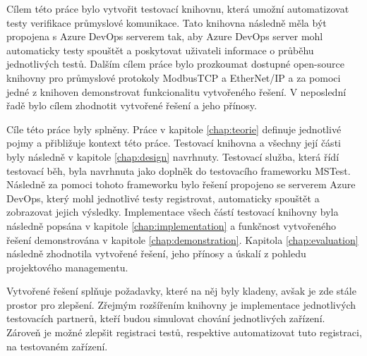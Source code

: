 \begin{conclusion}
Cílem této práce bylo vytvořit testovací knihovnu, která umožní automatizovat testy verifikace průmyslové komunikace. Tato knihovna následně měla být propojena s Azure DevOps serverem tak, aby Azure DevOps server mohl automaticky testy spouštět a poskytovat uživateli informace o průběhu jednotlivých testů. Dalším cílem práce bylo prozkoumat dostupné open-source knihovny pro průmyslové protokoly ModbusTCP a EtherNet/IP a za pomoci jedné z knihoven demonstrovat funkcionalitu vytvořeného řešení. V neposlední řadě bylo cílem zhodnotit vytvořené řešení a jeho přínosy.

Cíle této práce byly splněny. Práce v kapitole \ref{chap:teorie} definuje jednotlivé pojmy a přibližuje kontext této práce. Testovací knihovna a všechny její části byly následně v kapitole \ref{chap:design} navrhnuty. Testovací služba, která řídí testovací běh, byla navrhnuta jako doplněk do testovacího frameworku MSTest. Následně za pomoci tohoto frameworku bylo řešení propojeno se serverem Azure DevOps, který mohl jednotlivé testy registrovat, automaticky spouštět a zobrazovat jejich výsledky. Implementace všech částí testovací knihovny byla následně popsána v kapitole \ref{chap:implementation} a funkčnost vytvořeného řešení demonstrována v kapitole \ref{chap:demonstration}. Kapitola \ref{chap:evaluation} následně zhodnotila vytvořené řešení, jeho přínosy a úskalí z pohledu projektového managementu. 

Vytvořené řešení splňuje požadavky, které na něj byly kladeny, avšak je zde stále prostor pro zlepšení. Zřejmým rozšířením knihovny je implementace jednotlivých testovacích partnerů, kteří budou simulovat chování jednotlivých zařízení. Zároveň je možné zlepšit registraci testů, respektive automatizovat tuto registraci, na testovaném zařízení. 
\end{conclusion}